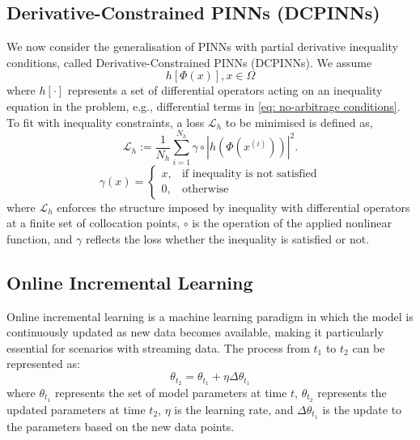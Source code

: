 \documentclass[sigconf, authorversion=true, nonacm=true]{acmart}
\begin{document}
\subsection{Derivative-Constrained PINNs (DCPINNs)}
\label{subsection: Loss Considerations for Inequality-Differential Constraints}
We now consider the generalisation of PINNs with partial derivative inequality conditions, called Derivative-Constrained PINNs (DCPINNs). We assume
\begin{equation}
    h[\Phi(x)], x \in \Omega
\end{equation}
where $h[\cdot]$ represents a set of differential operators acting on an inequality equation in the problem, e.g., differential terms in \eqref{eq: no-arbitrage conditions}. To fit with inequality constraints, a loss $\mathcal{L}_h$ to be minimised is defined as,
\begin{equation}
    \mathcal{L}_h := \frac{1}{N_h} \sum_{i=1}^{N_h} \gamma \circ \left|h\left(\Phi(x^{(i)})\right)\right|^2.
\label{eq: dcpinns_metric}
\end{equation}
\begin{equation}
    \gamma(x) = \begin{cases}{x}, & \text{if inequality is not satisfied} \\ 0, & \text{otherwise}\end{cases}
\end{equation}
where $\mathcal{L}_h$ enforces the structure imposed by inequality with differential operators at a finite set of collocation points, $\circ$ is the operation of the applied nonlinear function, and $\gamma$ reflects the loss whether the inequality is satisfied or not.

\subsection{Online Incremental Learning}
Online incremental learning is a machine learning paradigm in which the model is continuously updated as new data becomes available, making it particularly essential for scenarios with streaming data. The process from $t_1$ to $t_2$ can be represented as:
\begin{equation}
\theta_{t_2} = \theta_{t_1} + \eta \Delta\theta_{t_1}
\end{equation}
where $\theta_{t_1}$ represents the set of model parameters at time $t$, $\theta_{t_2}$ represents the updated parameters at time $t_2$, $\eta$ is the learning rate, and $\Delta\theta_{t_1}$ is the update to the parameters based on the new data points.
\end{document}
